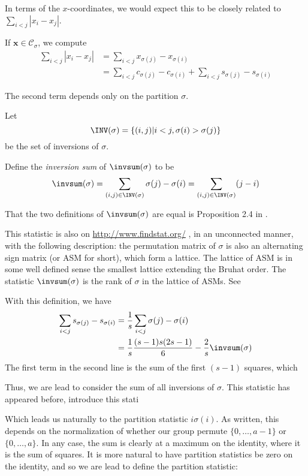 \begin{lemma}
In terms of the $x$-coordinates, we would expect this to be closely related to $\sum_{i<j}|x_i-x_j|$.

If $\mathbf{x}\in \mathcal{C}_\sigma$, we compute
\begin{align*}
\sum_{i<j} |x_i-x_j|&=\sum_{i<j} x_{\sigma(j)}-x_{\sigma(i)}\\
&=\sum_{i<j} c_{\sigma(j)}-c_{\sigma(i)}+\sum_{i<j}s_{\sigma(j)}-s_{\sigma(i)} \end{align*}

The second term depends only on the partition $\sigma$.

\begin{definition}[\cite{SU}] Let $$\INV(\sigma)=\{(i,j)|i<j,\sigma(i)>\sigma(j)\}$$ be the set of inversions of $\sigma$.

Define the \emph{inversion sum} of $\invsum(\sigma)$ to be
$$\invsum(\sigma)=\sum_{(i,j)\in\INV(\sigma)}
\sigma(j)-\sigma(i)=\sum_{(i,j)\in\INV(\sigma)} (j-i)$$
\end{definition}

\begin{remark}
That the two definitions of $\invsum(\sigma)$ are equal is Proposition 2.4 in \cite{SU}.

This statistic is also on \url{http://www.findstat.org/} , in an
unconnected manner, with the following description: the permutation
matrix of $\sigma$ is also an alternating sign matrix (or ASM for
short), which form a lattice.  The lattice of ASM is in some well
defined sense the smallest lattice extending the Bruhat order.  The
statistic $\invsum(\sigma)$ is the rank of $\sigma$ in the lattice of
ASMs.  See \cite{}
\end{remark}

With this definition, we have
\begin{align*}\sum_{i<j}s_{\sigma(j)}-s_{\sigma(i)} &=\frac{1}{s}\sum_{i<j}\sigma(j)-\sigma(i)\\
&=\frac{1}{s}\frac{(s-1)s(2s-1)}{6}-\frac{2}{s}\invsum(\sigma)
\end{align*}
The first term in the second line is the sum of the first $(s-1)$
squares, which



Thus, we are lead to consider the sum of all inversions of $\sigma$.
This statistic has appeared before, \cite{SU} introduce this stati






Which leads us naturally to the partition statistic $i\sigma(i)$.  As written, this depends on the normalization of whether our group permute $\{0,\dots,a-1\}$ or $\{0,\dots,a\}$.  In any case, the sum is clearly at a maximum on the identity,  where it is the sum of squares.  It is more natural to have partition statistics be zero on the identity, and so we are lead to define the partition statistic:


\end{lemma}
